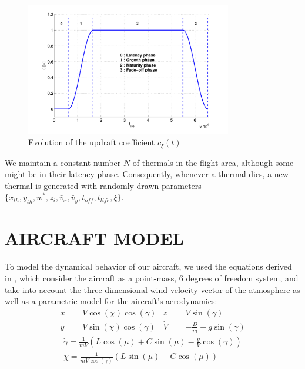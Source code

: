\documentclass[a4paper, 10pt, conference]{ieeeconf}
\begin{document}
\begin{figure}%
\begin{center}
 \includegraphics[width=9cm]{img/lifeCycle.pdf}
\end{center}
\caption{Evolution of the updraft coefficient $c_\xi(t)$}
\label{fig:life_cycle}
\end{figure}

We maintain a constant number $N$ of thermals in the flight area, although some might be in their latency phase. Consequently, whenever a thermal dies, a new thermal is generated with randomly drawn parameters $\{x_{th},y_{th}, w^*, z_i, \bar{v}_x, \bar{v}_y, t_{\textit{off}}, t_{\textit{life}}, \xi \}$.


\section{AIRCRAFT MODEL}
\label{sec:aircraft}

To model the dynamical behavior of our aircraft, we used the equations derived in \cite{dynamic}, which consider the aircraft as a point-mass, 6 degrees of freedom system, and take into account the three dimensional wind velocity vector of the atmosphere as well as a parametric model for the aircraft's aerodynamics:
\begin{align*}
\dot{x} &= V \cos(\chi)\cos(\gamma) & \dot{z} &= V \sin(\gamma)\\
\dot{y} &= V \sin(\chi)\cos(\gamma) & \dot{V} &= -\frac{D}{m}-g \sin(\gamma)
\end{align*}
\begin{gather*}
\dot{\gamma}  = \frac{1}{mV}\left(L\cos(\mu) + C \sin(\mu) - \frac{g}{V}\cos(\gamma)\right) \\
\dot{\chi} = \frac{1}{mV \cos(\gamma)}\left(L\sin\left(\mu\right)-C \cos\left(\mu\right)\right)
\end{gather*}
\end{document}
